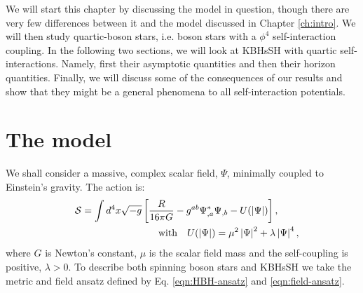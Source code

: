 We will start this chapter by discussing the model in question, though there are very few differences between it and the model discussed in Chapter \ref{ch:intro}.
We will then study quartic-boson stars, i.e. boson stars with a $\phi^4$ self-interaction coupling.
In the following two sections, we will look at KBHsSH with quartic self-interactions.
Namely, first their asymptotic quantities and then their horizon quantities.
Finally, we will discuss some of the consequences of our results and show that they might be a general phenomena to all self-interaction potentials.

 
\section{The model}
\label{SIsec_model}
 
We shall consider a massive, complex scalar field, $\Psi$, minimally coupled to Einstein's gravity. The action is:
%
\begin{eqnarray}
  \label{Intaction}
  &&
	\mathcal{S} = \int d^4x \sqrt{-g}\left[\frac{R}{16\pi G}- g^{ab}\Psi^*_{,a}\Psi_{,b} - U(|\Psi|)\right],~~{~~} \ \  
\\
\label{pot}
&&~~~~{\rm with}~~~U(|\Psi|)= \mu^2\left|\Psi\right|^2 + \lambda\left|\Psi\right|^4,
\end{eqnarray}  
where $G$ is Newton's constant, $\mu$ is the scalar field mass and the self-coupling is positive, $ \lambda>0$. 
%
To describe both spinning boson stars and KBHsSH we take the metric and field ansatz defined by Eq. \eqref{eqn:HBH-ansatz} and \eqref{eqn:field-ansatz}.

